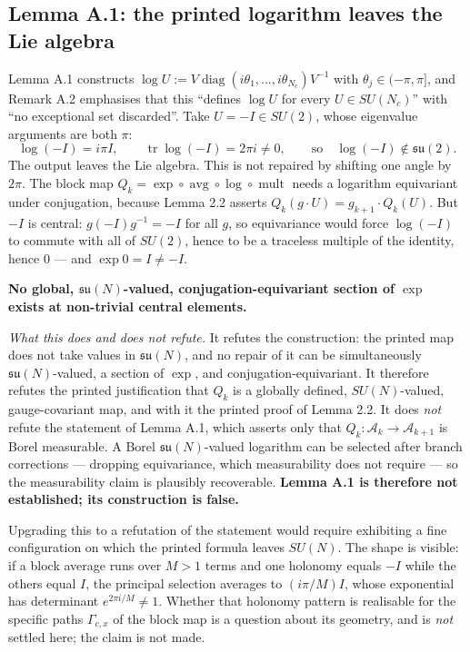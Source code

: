 \documentclass[11pt]{article}
\newcommand{\su}{\mathfrak{su}}
\begin{document}
\subsection{Lemma A.1: the printed logarithm leaves the Lie algebra}

Lemma A.1 constructs $\log U:=V\operatorname{diag}(i\theta_1,\dots,i\theta_{N_c})V^{-1}$
with $\theta_j\in(-\pi,\pi]$, and Remark A.2 emphasises that this ``defines $\log U$
for every $U\in SU(N_c)$'' with ``no exceptional set discarded''. Take $U=-I\in SU(2)$,
whose eigenvalue arguments are both $\pi$:
\[
\log(-I)=i\pi I,\qquad \operatorname{tr}\log(-I)=2\pi i\neq0,
\qquad\text{so}\quad \log(-I)\notin\su(2).
\]
The output leaves the Lie algebra. This is not repaired by shifting one angle by
$2\pi$. The block map $Q_k=\exp\circ\operatorname{avg}\circ\log\circ\operatorname{mult}$
needs a logarithm equivariant under conjugation, because Lemma 2.2 asserts
$Q_k(g\cdot U)=g_{k+1}\cdot Q_k(U)$. But $-I$ is central: $g(-I)g^{-1}=-I$ for all $g$,
so equivariance would force $\log(-I)$ to commute with all of $SU(2)$, hence to be a
traceless multiple of the identity, hence $0$ --- and $\exp 0=I\neq-I$.

\textbf{No global, $\su(N)$-valued, conjugation-equivariant section of $\exp$ exists at
non-trivial central elements.}

\emph{What this does and does not refute.} It refutes the construction: the printed
map does not take values in $\su(N)$, and no repair of it can be simultaneously
$\su(N)$-valued, a section of $\exp$, and conjugation-equivariant. It therefore
refutes the printed justification that $Q_k$ is a globally defined, $SU(N)$-valued,
gauge-covariant map, and with it the printed proof of Lemma 2.2. It does \emph{not}
refute the statement of Lemma A.1, which asserts only that
$Q_k:\mathcal A_k\to\mathcal A_{k+1}$ is Borel measurable. A Borel $\su(N)$-valued
logarithm can be selected after branch corrections --- dropping equivariance, which
measurability does not require --- so the measurability claim is plausibly recoverable.
\textbf{Lemma A.1 is therefore not established; its construction is false.}

Upgrading this to a refutation of the statement would require exhibiting a fine
configuration on which the printed formula leaves $SU(N)$. The shape is visible: if a
block average runs over $M>1$ terms and one holonomy equals $-I$ while the others equal
$I$, the principal selection averages to $(i\pi/M)I$, whose exponential has determinant
$e^{2\pi i/M}\neq1$. Whether that holonomy pattern is realisable for the specific paths
$\Gamma_{c,x}$ of the block map is a question about its geometry, and is \emph{not}
settled here; the claim is not made.
\end{document}
